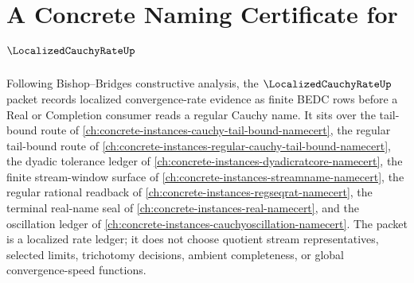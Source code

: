 \chapter{A Concrete Naming Certificate for $\LocalizedCauchyRateUp$}
\label{ch:concrete-instances-localized-cauchy-rate-namecert}

Following Bishop--Bridges constructive analysis, the $\LocalizedCauchyRateUp$ packet records localized convergence-rate evidence as finite BEDC rows before a Real or Completion consumer reads a regular Cauchy name. It sits over the tail-bound route of \autoref{ch:concrete-instances-cauchy-tail-bound-namecert}, the regular tail-bound route of \autoref{ch:concrete-instances-regular-cauchy-tail-bound-namecert}, the dyadic tolerance ledger of \autoref{ch:concrete-instances-dyadicratcore-namecert}, the finite stream-window surface of \autoref{ch:concrete-instances-streamname-namecert}, the regular rational readback of \autoref{ch:concrete-instances-regseqrat-namecert}, the terminal real-name seal of \autoref{ch:concrete-instances-real-namecert}, and the oscillation ledger of \autoref{ch:concrete-instances-cauchyoscillation-namecert}. The packet is a localized rate ledger; it does not choose quotient stream representatives, selected limits, trichotomy decisions, ambient completeness, or global convergence-speed functions.

